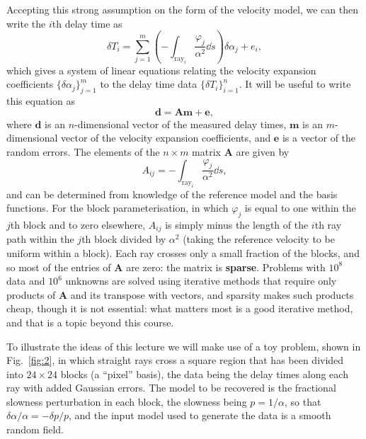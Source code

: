 Accepting this strong assumption on the form of the velocity model, we can then write the $i$th delay time as
\begin{equation}
    \delta T_{i} = \sum_{j=1}^{m} \left(-\int_{\mathrm{ray}_{i}} \frac{\varphi_{j}}{\alpha^{2}} \dd s \right) \delta\alpha_{j} + e_{i},
    \label{eq:9}
\end{equation}
which gives a system of linear equations relating the velocity expansion coefficients $\{\delta\alpha_{j}\}_{j=1}^{m}$ to the delay time data $\{\delta T_{i}\}_{i=1}^{n}$. It will be useful to write this equation as
\begin{equation}
    \mathbf{d} = \mathbf{A}\mathbf{m} + \mathbf{e},
    \label{eq:10}
\end{equation}
where $\mathbf{d}$ is an $n$-dimensional vector of the measured delay times, $\mathbf{m}$ is an $m$-dimensional vector of the 
velocity expansion coefficients, and $\mathbf{e}$ is a vector of the random errors. The elements of the $n\times m$ matrix 
$\mathbf{A}$ are given by
\begin{equation}
    A_{ij} = -\int_{\mathrm{ray}_{i}} \frac{\varphi_{j}}{\alpha^{2}} \dd s,
    \label{eq:11}
\end{equation}
and can be determined from knowledge of the reference model and the basis functions. For the block parameterisation, in 
which $\varphi_{j}$ is equal to one within the $j$th block and to zero elsewhere, $A_{ij}$ is simply minus the length of the 
$i$th ray path within the $j$th block divided by $\alpha^{2}$ (taking the reference velocity to be uniform within a block). 
Each ray crosses only a small fraction of the blocks, and so most of the entries of $\mathbf{A}$ are zero: the matrix is 
\textbf{sparse}. Problems with $10^{8}$ data and $10^{6}$ unknowns are solved using iterative methods that require only 
products of $\mathbf{A}$ and its transpose with vectors, and sparsity makes such products cheap, though it is not essential: 
what matters most is a good iterative method, and that is a topic beyond this course.

To illustrate the ideas of this lecture we will make use of a toy problem, shown in Fig.~\ref{fig:2}, in which straight 
rays cross a square region that has been divided into $24\times24$ blocks (a ``pixel'' basis), the data being the delay 
times along each ray with added Gaussian errors. The model to be recovered is the fractional slowness perturbation in each 
block, the slowness being $p = 1/\alpha$, so that $\delta\alpha/\alpha = -\delta p/p$, and the input model used to generate 
the data is a smooth random field.


